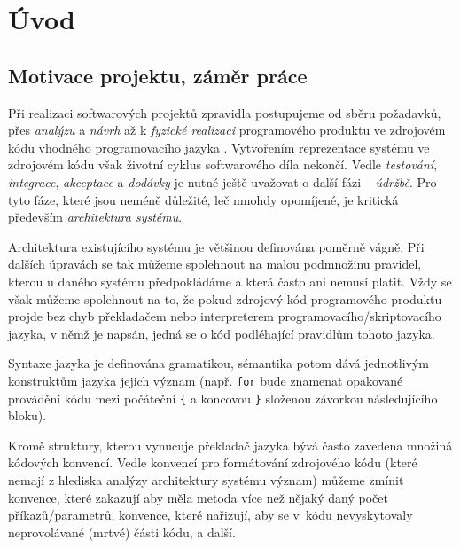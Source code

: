 \chapter{Úvod}


\section{Motivace projektu, záměr práce}
\label{introduction-motivation}

Při realizaci softwarových projektů zpravidla postupujeme od sběru požadavků, přes \emph{analýzu} a \emph{návrh} až k \emph{fyzické realizaci} programového produktu ve zdrojovém kódu vhodného programovacího jazyka \cite{wiki:sdlc}. Vytvořením reprezentace systému ve zdrojovém kódu však životní cyklus softwarového díla nekončí. Vedle \emph{testování}, \emph{integrace}, \emph{akceptace} a \emph{dodávky} je nutné ještě uvažovat o další fázi -- \emph{údržbě}. Pro tyto fáze, které jsou neméně důležité, leč mnohdy opomíjené, je kritická především \emph{architektura systému}.

Architektura existujícího systému je většinou definována poměrně vágně. Při dalších úpravách se tak můžeme spolehnout na malou podmnožinu pravidel, kterou u daného systému předpokládáme a která často ani nemusí platit. Vždy se však můžeme spolehnout na to, že pokud zdrojový kód programového produktu projde bez chyb překladačem nebo interpreterem programovacího/skriptovacího jazyka, v němž je napsán, jedná se o kód podléhající pravidlům tohoto jazyka.

Syntaxe jazyka je definována gramatikou, sémantika potom dává jednotlivým konstruktům jazyka jejich význam (např. \verb+for+ bude znamenat opakované provádění kódu mezi počáteční \verb+{+ a koncovou \verb+}+ složenou závorkou následujícího bloku).

Kromě struktury, kterou vynucuje překladač jazyka bývá často zavedena množiná kódových konvencí. Vedle konvencí pro formátování zdrojového kódu (které nemají z hlediska analýzy architektury systému význam) můžeme zmínit konvence, které zakazují aby měla metoda více než nějaký daný počet příkazů/parametrů, konvence, které nařizují, aby se v~kódu nevyskytovaly neprovolávané (mrtvé) části kódu, a další.

